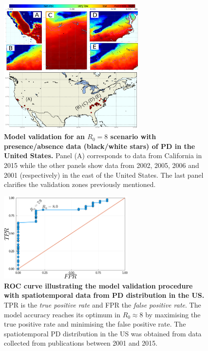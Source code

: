 \begin{figure}[H]
    \centering
    \includegraphics[width=0.65\textwidth]{Figures/validation.png}
    \caption[Model validation with PD presence/absence data]{\textbf{Model
            validation for an $R_0=8$ scenario with
            presence/absence data (black/white stars) of PD in the United
            States.} Panel
        (A) corresponds to data from California in 2015 while the other
        panels
        show
        data from 2002, 2005, 2006 and 2001 (respectively) in the east of
        the
        United
        States. The last panel clarifies the validation zones previously
        mentioned.}
    \label{fig:sup_validation} %
\end{figure}

\begin{figure}[H]
    \centering
    \includegraphics[width=0.6\textwidth]{Figures/ROC_curve.png}
    \caption[ROC curve illustrating the model validation procedure]{\textbf{ROC
            curve illustrating the model validation procedure
            with spatiotemporal data from PD distribution in the US.} TPR
        is
        the
        \textit{true positive rate} and FPR the \textit{false positive
            rate}.
        The model
        accuracy reaches its optimum in $R_0\approx8$ by maximising the
        true
        positive
        rate and minimising the false positive rate. The spatiotemporal PD
        distribution
        in the US was obtained from data collected from publications
        between
        2001 and
        2015.}
    \label{fig:sup_ROC} %
\end{figure}

